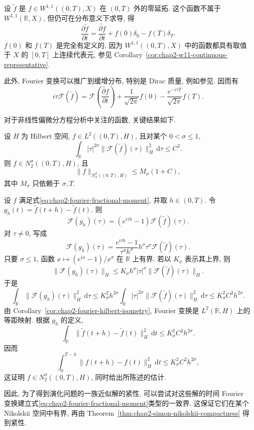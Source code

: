 设 $\widetilde f$ 是 $f\in W^{1,1}((0,T),X)$ 在 $(0,T)$ 外的零延拓. 这个函数不属于 $W^{1,1}(\mathbb{R},X)$, 但仍可在分布意义下求导, 得
\[
 \frac{\partial\widetilde f}{\partial t}
 =\widetilde{\frac{\partial f}{\partial t}}+f(0)\delta_0-f(T)\delta_T.
\]
$f(0)$ 和 $f(T)$ 是完全有定义的, 因为 $W^{1,1}((0,T),X)$ 中的函数都具有取值于 $X$ 的 $[0,T]$ 上连续代表元, 参见 Corollary~\ref{cor:chap2-w11-continuous-representative}.

此外, Fourier 变换可以推广到缓增分布, 特别是 Dirac 质量, 例如参见. 因而有
\begin{equation}
 i\tau\mathcal{F}(\widetilde f)
 =\mathcal{F}\left(\widetilde{\frac{\partial f}{\partial t}}\right)
 +\frac1{\sqrt{2\pi}}f(0)-\frac{e^{-i\tau T}}{\sqrt{2\pi}}f(T).
 \label{eq:chap2-fourier-zero-extension-derivative}
\end{equation}

对于非线性偏微分方程分析中关注的函数, 关键结果如下.

\begin{Proposition}
\label{prop:chap2-fourier-nikolskii}
设 $H$ 为 Hilbert 空间, $f\in L^2((0,T),H)$, 且对某个 $0<\sigma\leq1$,
\begin{equation}
 \int_\mathbb{R}|\tau|^{2\sigma}
 \|\mathcal{F}(\widetilde f)(\tau)\|_H^2\,\mathrm{d}\tau\leq C^2.
 \label{eq:chap2-fourier-fractional-moment}
\end{equation}
则 $f\in N_2^\sigma((0,T),H)$, 且
\[
 \|f\|_{N_2^\sigma((0,T),H)}\leq M_\sigma(1+C),
\]
其中 $M_\sigma$ 只依赖于 $\sigma,T$.
\end{Proposition}

\begin{Proof}
设 $f$ 满足式\eqref{eq:chap2-fourier-fractional-moment}, 并取 $h\in(0,T)$. 令 $g_h(t)=\widetilde f(t+h)-\widetilde f(t)$. 则
\[
 \mathcal{F}(g_h)(\tau)=(e^{i\tau h}-1)\mathcal{F}(\widetilde f)(\tau).
\]
对 $\tau\neq0$, 写成
\[
 \mathcal{F}(g_h)(\tau)
 =\frac{e^{i\tau h}-1}{\tau^\sigma h^\sigma}
 h^\sigma\tau^\sigma\mathcal{F}(\widetilde f)(\tau).
\]
只要 $\sigma\leq1$, 函数 $x\mapsto(e^{ix}-1)/x^\sigma$ 在 $\mathbb{R}$ 上有界. 若以 $K_\sigma$ 表示其上界, 则
\[
 \|\mathcal{F}(g_h)(\tau)\|_H
 \leq K_\sigma h^\sigma|\tau|^\sigma
 \|\mathcal{F}(\widetilde f)(\tau)\|_H.
\]
于是
\[
 \int_\mathbb{R}\|\mathcal{F}(g_h)(\tau)\|_H^2\,\mathrm{d}\tau
 \leq K_\sigma^2h^{2\sigma}
 \int_\mathbb{R}|\tau|^{2\sigma}
 \|\mathcal{F}(\widetilde f)(\tau)\|_H^2\,\mathrm{d}\tau
 \leq K_\sigma^2C^2h^{2\sigma}.
\]
由 Corollary~\ref{cor:chap2-fourier-hilbert-isometry}, Fourier 变换是 $L^2(\mathbb{R},H)$ 上的等距映射. 根据 $g_h$ 的定义,
\[
 \int_\mathbb{R}\|\widetilde f(t+h)-\widetilde f(t)\|_H^2\,\mathrm{d}t
 \leq K_\sigma^2C^2h^{2\sigma}.
\]
因而
\[
 \int_0^{T-h}\|f(t+h)-f(t)\|_H^2\,\mathrm{d}t
 \leq K_\sigma^2C^2h^{2\sigma},
\]
这证明 $f\in N_2^\sigma((0,T),H)$, 同时给出所陈述的估计.
\end{Proof}

因此, 为了得到演化问题的一族近似解的紧性, 可以尝试对这些解的时间 Fourier 变换建立式\eqref{eq:chap2-fourier-fractional-moment}类型的一致界. 这保证它们在某个 Nikolskii 空间中有界, 再由 Theorem~\ref{thm:chap2-simon-nikolskii-compactness} 得到紧性.
